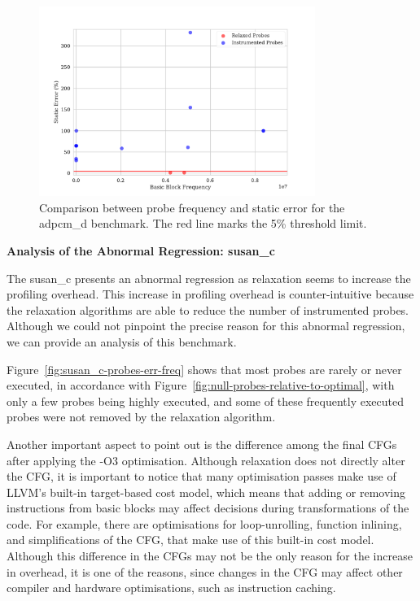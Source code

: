 \begin{figure}[H]
    \centering
    \includegraphics[width=0.8\textwidth]{figs/adpcm_d.pdf}
    \caption{Comparison between probe frequency and static error for the {\flagstype adpcm\_d} benchmark. The red line marks the 5\% threshold limit.}
    \label{fig:adpcm_d-probes-err-freq}
\end{figure}

\noindent \textbf{Analysis of the Abnormal Regression: {\flagstype susan\_c}}

The {\flagstype susan\_c} presents an abnormal regression as relaxation seems to increase the profiling overhead.
This increase in profiling overhead is counter-intuitive because the relaxation algorithms are able to reduce the number of instrumented probes.
Although we could not pinpoint the precise reason for this abnormal regression, we can provide an analysis of this benchmark.

Figure~\ref{fig:susan_c-probes-err-freq} shows that most probes are rarely or never executed, in accordance with Figure~\ref{fig:null-probes-relative-to-optimal},
with only a few probes being highly executed, and some of these frequently executed probes were not removed by the relaxation algorithm.

Another important aspect to point out is the difference among the final CFGs after applying the {\flagstype -O3} optimisation.
Although relaxation does not directly alter the CFG, it is important to notice that many optimisation passes make use of LLVM's built-in target-based cost model,
which means that adding or removing instructions from basic blocks may affect decisions during transformations of the code.
For example, there are optimisations for loop-unrolling, function inlining, and simplifications of the CFG, that make use of this built-in cost model.
Although this difference in the CFGs may not be the only reason for the increase in overhead, it is one of the reasons, since changes in the CFG may affect other compiler and hardware optimisations, such as instruction caching.

